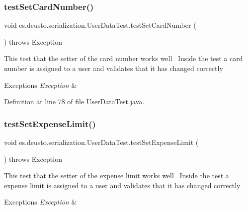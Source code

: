 \subsubsection{\texorpdfstring{test\+Set\+Card\+Number()}{testSetCardNumber()}}
{\footnotesize\ttfamily void es.\+deusto.\+serialization.\+User\+Data\+Test.\+test\+Set\+Card\+Number (\begin{DoxyParamCaption}{ }\end{DoxyParamCaption}) throws Exception}

This test that the setter of the card number works well~\newline
Inside the test a card number is assigned to a user and validates that it has changed correctly~\newline

\begin{DoxyExceptions}{Exceptions}
{\em Exception} & \\
\hline
\end{DoxyExceptions}


Definition at line 78 of file User\+Data\+Test.\+java.

\mbox{\label{classes_1_1deusto_1_1serialization_1_1_user_data_test_ac7e111d2323a6970210cfa086b2eedff}} 
\subsubsection{\texorpdfstring{test\+Set\+Expense\+Limit()}{testSetExpenseLimit()}}
{\footnotesize\ttfamily void es.\+deusto.\+serialization.\+User\+Data\+Test.\+test\+Set\+Expense\+Limit (\begin{DoxyParamCaption}{ }\end{DoxyParamCaption}) throws Exception}

This test that the setter of the expense limit works well~\newline
Inside the test a expense limit is assigned to a user and validates that it has changed correctly~\newline

\begin{DoxyExceptions}{Exceptions}
{\em Exception} & \\
\hline
\end{DoxyExceptions}



